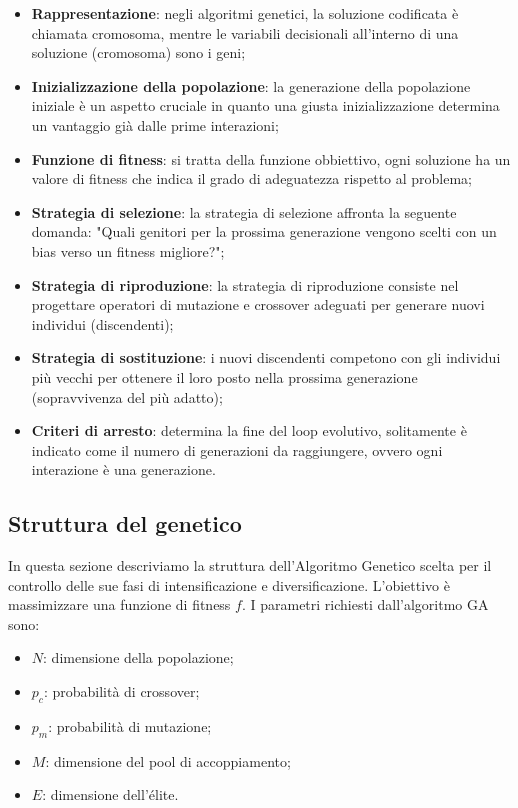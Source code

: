 \begin{itemize}
    \item \textbf{Rappresentazione}: negli algoritmi genetici, la soluzione codificata è chiamata cromosoma, mentre le variabili decisionali all'interno di una soluzione (cromosoma) sono i geni;
    
    \item \textbf{Inizializzazione della popolazione}: la generazione della popolazione iniziale è un aspetto cruciale in quanto una giusta inizializzazione determina un vantaggio già dalle prime interazioni;
    
    \item \textbf{Funzione di fitness}: si tratta della funzione obbiettivo, ogni soluzione ha un valore di fitness che indica il grado di adeguatezza rispetto al problema;
    
    \item \textbf{Strategia di selezione}: la strategia di selezione affronta la seguente domanda: "Quali genitori per la prossima generazione vengono scelti con un bias verso un fitness migliore?";
    
    \item \textbf{Strategia di riproduzione}: la strategia di riproduzione consiste nel progettare operatori di mutazione e crossover adeguati per generare nuovi individui (discendenti);
    
    \item \textbf{Strategia di sostituzione}: i nuovi discendenti competono con gli individui più vecchi per ottenere il loro posto nella prossima generazione (sopravvivenza del più adatto);
    
    \item \textbf{Criteri di arresto}: determina la fine del loop evolutivo, solitamente è indicato come il numero di generazioni da raggiungere, ovvero ogni interazione è una generazione.
\end{itemize}

\subsection{Struttura del genetico}

In questa sezione descriviamo la struttura dell'Algoritmo Genetico scelta per il controllo delle sue fasi di intensificazione e diversificazione.
L'obiettivo è massimizzare una funzione di fitness $f$. I parametri richiesti dall'algoritmo GA sono:

\begin{itemize}
    \item $N$: dimensione della popolazione;
    \item $p_c$: probabilità di crossover;
    \item $p_m$: probabilità di mutazione;
    \item $M$: dimensione del pool di accoppiamento;
    \item $E$: dimensione dell'élite.
\end{itemize}

